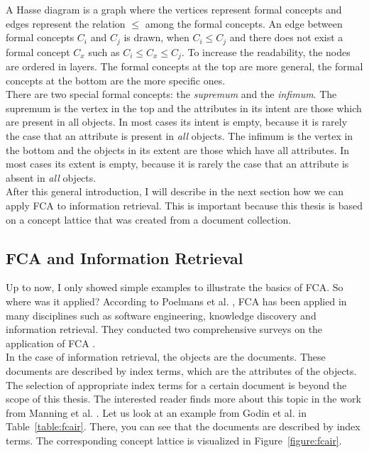\documentclass[11pt]{report}
\begin{document}
A Hasse diagram is a graph where the vertices represent formal concepts and edges represent the relation $\le$ among the formal concepts. An edge between formal concepts $C_i$ and $C_j$ is drawn, when $C_i \le C_j$ and there does not exist a formal concept $C_x$ such as $C_i \le C_x \le C_j$. To increase the readability, the nodes are ordered in layers. The formal concepts at the top are more general, the formal concepts at the bottom are the more specific ones.\\

There are two special formal concepts: the \textit{supremum} and the \textit{infimum}. The supremum is the vertex in the top and the attributes in its intent are those which are present in all objects. In most cases its intent is empty, because it is rarely the case that an attribute is present in \textit{all} objects. The infimum is the vertex in the bottom and the objects in its extent are those which have all attributes. In most cases its extent is empty, because it is rarely the case that an attribute is absent in \textit{all} objects.\\

After this general introduction, I will describe in the next section how we can apply FCA to information retrieval. This is important because this thesis is based on a concept lattice that was created from a document collection.

\subsection{FCA and Information Retrieval}
\label{section:fcair}

Up to now, I only showed simple examples to illustrate the basics of FCA. So where was it applied? According to Poelmans et al. \cite{Poelmans2013}, FCA has been applied in many disciplines such as software engineering, knowledge discovery and information retrieval. They conducted two comprehensive surveys on the application of FCA \cite{Poelmans2013, Poelmans2013b}.\\

In the case of information retrieval, the objects are the documents. These documents are described by index terms, which are the attributes of the objects. The selection of appropriate index terms for a certain document is beyond the scope of this thesis. The interested reader finds more about this topic in the work from Manning et al. \cite{manning2008introduction}. Let us look at an example from Godin et al. \cite{Godin1993} in Table~\ref{table:fcair}. There, you can see that the documents are described by index terms. The corresponding concept lattice is visualized in Figure~\ref{figure:fcair}.
\end{document}
